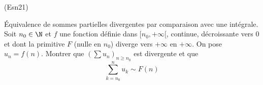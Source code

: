 \begin{tiny}(Esn21)\end{tiny} \'Equivalence de sommes partielles divergentes par comparaison avec une intégrale.\newline
Soit $n_0\in \N$ et $f$ une fonction définie dans $[n_0,+\infty[$, continue, décroissante vers $0$ et dont la primitive $F$ (nulle en $n_0$) diverge vers $+\infty$ en $+\infty$.\newline
On pose $u_n = f(n)$. Montrer que $\left( \sum u_n\right)_{n\geq n_0}$ est divergente et que 
\begin{displaymath}
  \sum_{k=n_0}^n u_k \sim F(n)
\end{displaymath}
